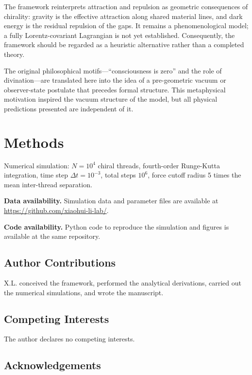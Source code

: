 \documentclass[12pt,a4paper]{article}
\begin{document}
The framework reinterprets attraction and repulsion as geometric consequences of chirality: gravity is the effective attraction along shared material lines, and dark energy is the residual repulsion of the gaps. It remains a phenomenological model; a fully Lorentz-covariant Lagrangian is not yet established. Consequently, the framework should be regarded as a heuristic alternative rather than a completed theory.

The original philosophical motifs---``consciousness is zero'' and the role of divination---are translated here into the idea of a pre-geometric vacuum or observer-state postulate that precedes formal structure. This metaphysical motivation inspired the vacuum structure of the model, but all physical predictions presented are independent of it.

\section*{Methods}

Numerical simulation: $N=10^4$ chiral threads, fourth-order Runge-Kutta integration, time step $\Delta t=10^{-3}$, total steps $10^6$, force cutoff radius 5 times the mean inter-thread separation.

\noindent\textbf{Data availability.} Simulation data and parameter files are available at \url{https://github.com/xiaohui-li-lab/}.

\noindent\textbf{Code availability.} Python code to reproduce the simulation and figures is available at the same repository.

\subsection*{Author Contributions}

X.L. conceived the framework, performed the analytical derivations, carried out the numerical simulations, and wrote the manuscript.

\subsection*{Competing Interests}

The author declares no competing interests.

\subsection*{Acknowledgements}
\end{document}
